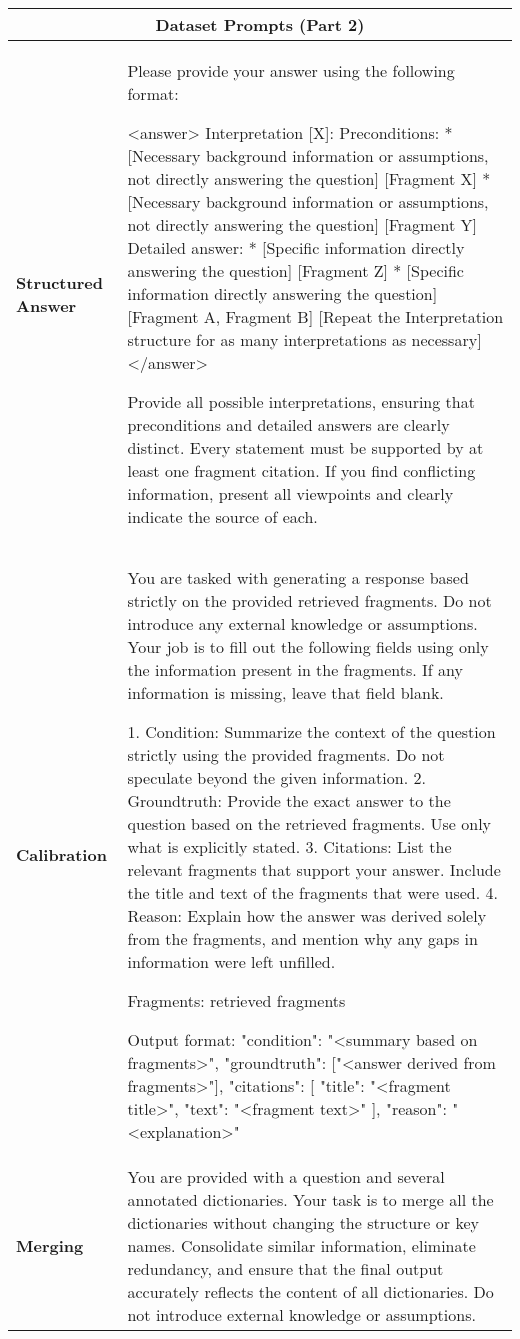 \begin{tabular}{l p{}}
\hline
\multicolumn{2}{c}{\textbf{Dataset Prompts (Part 2)}} \\
\hline
\textbf{Structured Answer} & Please provide your answer using the following format:

<answer>
Interpretation [X]:
Preconditions:
* [Necessary background information or assumptions, not directly answering the question] [Fragment X]
* [Necessary background information or assumptions, not directly answering the question] [Fragment Y]
Detailed answer:
* [Specific information directly answering the question] [Fragment Z]
* [Specific information directly answering the question] [Fragment A, Fragment B]
[Repeat the Interpretation structure for as many interpretations as necessary]
</answer>

Provide all possible interpretations, ensuring that preconditions and detailed answers are clearly distinct. Every statement must be supported by at least one fragment citation. If you find conflicting information, present all viewpoints and clearly indicate the source of each.\\

\hline
\textbf{Calibration} & You are tasked with generating a response based strictly on the provided retrieved fragments. Do not introduce any external knowledge or assumptions. Your job is to fill out the following fields using only the information present in the fragments. If any information is missing, leave that field blank.

1. Condition: Summarize the context of the question strictly using the provided fragments. Do not speculate beyond the given information.
2. Groundtruth: Provide the exact answer to the question based on the retrieved fragments. Use only what is explicitly stated.
3. Citations: List the relevant fragments that support your answer. Include the title and text of the fragments that were used.
4. Reason: Explain how the answer was derived solely from the fragments, and mention why any gaps in information were left unfilled.

Fragments:
{retrieved fragments}

Output format:
{
  "condition": "<summary based on fragments>",
  "groundtruth": ["<answer derived from fragments>"],
  "citations": [
    {
      "title": "<fragment title>",
      "text": "<fragment text>"
    }
  ],
  "reason": "<explanation>"
} \\
\hline
\textbf{Merging} & You are provided with a question and several annotated dictionaries. Your task is to merge all the dictionaries without changing the structure or key names. Consolidate similar information, eliminate redundancy, and ensure that the final output accurately reflects the content of all dictionaries. Do not introduce external knowledge or assumptions.


\end{tabular}
